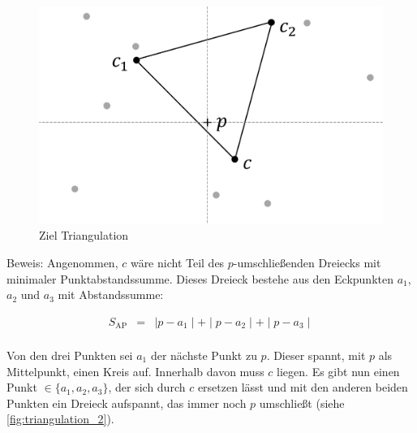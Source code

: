\documentclass[a4paper]{extarticle}
\begin{document}
    \begin{figure}[!ht]
        \centering	
        \includegraphics[scale=0.10]{bilder/tri_1.pdf}
        \caption{Ziel Triangulation}
        \label{fig:triangulation_1}
    \end{figure}

    Beweis:
    Angenommen, $c$ wäre nicht Teil des $p$-umschließenden Dreiecks mit minimaler Punktabstandssumme.
    Dieses Dreieck bestehe aus den Eckpunkten $a_1$, $a_2$ und $a_3$ mit Abstandssumme:

    \begin{eqnarray*}
        S_{\text{AP}} &=& \mid p - a_1 \mid + \mid p - a_2 \mid + \mid p - a_3 \mid \\
    \end{eqnarray*}
    
    Von den drei Punkten sei $a_1$ der nächste Punkt zu $p$. Dieser spannt, mit $p$ als Mittelpunkt, 
    einen Kreis auf. Innerhalb davon muss $c$ liegen.
    Es gibt nun einen Punkt $\in \{ a_1, a_2, a_3 \}$, der sich durch $c$ ersetzen lässt und
    mit den anderen beiden Punkten ein Dreieck aufspannt, das immer noch $p$ umschließt 
    (siehe \ref{fig:triangulation_2}).
\end{document}
